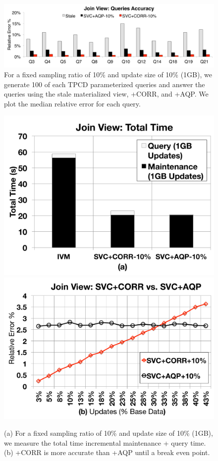 \begin{figure}[t]
\centering
\includegraphics[scale=0.14]{exp/msj_3.pdf}\vspace{-1.5em}
 \caption{For a fixed sampling ratio of 10\% and update size of 10\% (1GB), we generate 100 of each TPCD parameterized queries and answer the queries using the stale materialized view, \svcnospace+CORR, and \svcnospace+AQP. We plot the median relative error for each query. \label{exp-1-acc}}\vspace{-1.5em}
\end{figure}

\begin{figure}[t]
\centering
 \includegraphics[scale=0.13]{exp/msj_4.pdf}
 \includegraphics[scale=0.13]{exp/msj_6.pdf}
  \caption{(a) For a fixed sampling ratio of 10\% and update size of 10\% (1GB), we measure the total time incremental maintenance + query time. (b) \svcnospace+CORR is more accurate than \svcnospace+AQP until a break even point. \vspace{-1em} \label{exp-1-total}}
\end{figure}

